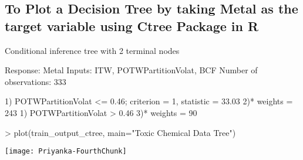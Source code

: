 \documentclass{article}
\begin{document}
\subsection*{To Plot a Decision Tree by taking Metal as the target variable using Ctree Package in R }
\begin{Schunk}
\begin{Soutput}
	 Conditional inference tree with 2 terminal nodes

Response:  Metal 
Inputs:  ITW, POTWPartitionVolat, BCF 
Number of observations:  333 

1) POTWPartitionVolat <= 0.46; criterion = 1, statistic = 33.03
  2)*  weights = 243 
1) POTWPartitionVolat > 0.46
  3)*  weights = 90 
\end{Soutput}
\begin{Sinput}
> plot(train_output_ctree, main="Toxic Chemical Data Tree")
\end{Sinput}
\end{Schunk}
\texttt{[image: Priyanka-FourthChunk]}
\end{document}
